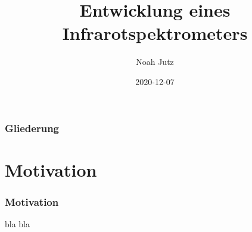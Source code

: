 \documentclass{beamer}
\title{Entwicklung eines Infrarotspektrometers}
\author{Noah Jutz}
\institute{Privat-Gymnasium PINDL Regensburg}
\date{2020-12-07}
\begin{document}
\frame{\titlepage}

\begin{frame}
    \frametitle{Gliederung}
    \tableofcontents
\end{frame}

\section{Motivation}

\begin{frame}
    \frametitle{Motivation}
    bla bla
\end{frame}
\end{document}
